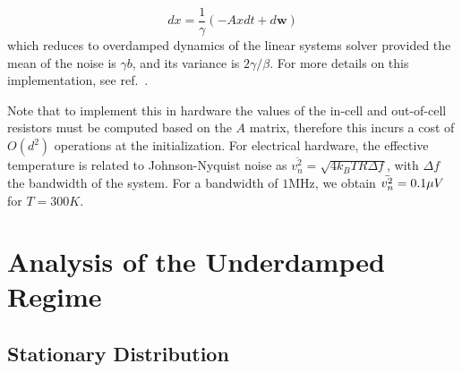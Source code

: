 \documentclass[prx,onecolumn,floatfix,longbibliography,notitlepage, nofootinbib]{revtex4-1}
\begin{document}
\begin{appendix}
\begin{equation}
   dx =  \frac{1}{\gamma}(-Axdt + d\mathbf{w})
\end{equation}
which reduces to overdamped dynamics of the linear systems solver provided the mean of the noise is $\gamma b$, and its variance is $2\gamma/\beta$. For more details on this implementation, see ref.~\cite{coles2023thermodynamic}. 



Note that to implement this in hardware the values of the in-cell and out-of-cell resistors must be computed based on the $A$ matrix, therefore this incurs a cost of $O(d^2)$ operations at the initialization. For electrical hardware, the effective temperature is related to Johnson-Nyquist noise as $\overline{v_n^2} = \sqrt{4k_BTR\Delta f}$, with $\Delta f$ the bandwidth of the system. For a bandwidth of $1 \text{MHz}$, we obtain $\Bar{v_n^2} = 0.1 \mu V$ for $T = 300K$.



\section{Analysis of the Underdamped Regime}
\label{app:UDL}

\subsection{Stationary Distribution }


\end{appendix}
\end{document}
